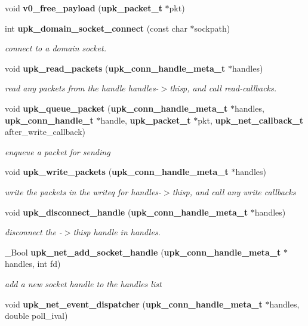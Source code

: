 \begin{DoxyCompactItemize}
void {\bf v0\_\-free\_\-payload} ({\bf upk\_\-packet\_\-t} $\ast$pkt)
\item 
int {\bf upk\_\-domain\_\-socket\_\-connect} (const char $\ast$sockpath)
\begin{DoxyCompactList}\small\item\em connect to a domain socket. \end{DoxyCompactList}\item 
void {\bf upk\_\-read\_\-packets} ({\bf upk\_\-conn\_\-handle\_\-meta\_\-t} $\ast$handles)
\begin{DoxyCompactList}\small\item\em read any packets from the handle handles-\/$>$thisp, and call read-\/callbacks. \end{DoxyCompactList}\item 
void {\bf upk\_\-queue\_\-packet} ({\bf upk\_\-conn\_\-handle\_\-meta\_\-t} $\ast$handles, {\bf upk\_\-conn\_\-handle\_\-t} $\ast$handle, {\bf upk\_\-packet\_\-t} $\ast$pkt, {\bf upk\_\-net\_\-callback\_\-t} after\_\-write\_\-callback)
\begin{DoxyCompactList}\small\item\em enqueue a packet for sending \end{DoxyCompactList}\item 
void {\bf upk\_\-write\_\-packets} ({\bf upk\_\-conn\_\-handle\_\-meta\_\-t} $\ast$handles)
\begin{DoxyCompactList}\small\item\em write the packets in the writeq for handles-\/$>$thisp, and call any write callbacks \end{DoxyCompactList}\item 
void {\bf upk\_\-disconnect\_\-handle} ({\bf upk\_\-conn\_\-handle\_\-meta\_\-t} $\ast$handles)
\begin{DoxyCompactList}\small\item\em disconnect the -\/$>$thisp handle in handles. \end{DoxyCompactList}\item 
\_\-Bool {\bf upk\_\-net\_\-add\_\-socket\_\-handle} ({\bf upk\_\-conn\_\-handle\_\-meta\_\-t} $\ast$handles, int fd)
\begin{DoxyCompactList}\small\item\em add a new socket handle to the handles list \end{DoxyCompactList}\item 
void {\bf upk\_\-net\_\-event\_\-dispatcher} ({\bf upk\_\-conn\_\-handle\_\-meta\_\-t} $\ast$handles, double poll\_\-ival)

\end{DoxyCompactItemize}
